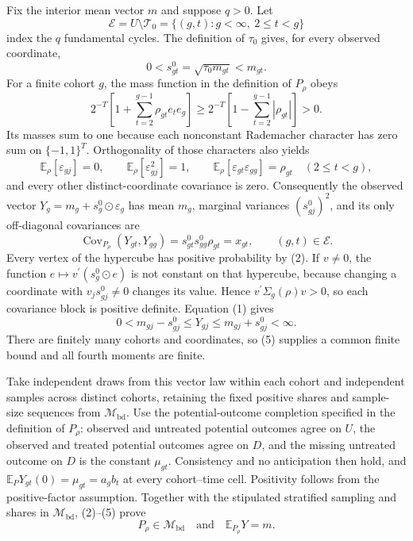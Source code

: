 Fix the interior mean vector \(m\) and suppose \(q>0\).  Let
\[
\mathcal E=U\setminus\mathcal T_0
=\{(g,t):g<\infty,\ 2\le t<g\}
\]
index the \(q\) fundamental cycles.  The definition of \(\tau_0\) gives, for every observed coordinate,
\[
0<s^0_{gt}=\sqrt{\tau_0m_{gt}}<m_{gt}.                 \tag{1}
\]
For a finite cohort \(g\), the mass function in the definition of \(P_\rho\) obeys
\[
2^{-T}\left[1+\sum_{t=2}^{g-1}\rho_{gt}e_te_g\right]
\ge
2^{-T}\left[1-\sum_{t=2}^{g-1}|\rho_{gt}|\right]>0.   \tag{2}
\]
Its masses sum to one because each nonconstant Rademacher character has zero sum on \(\{-1,1\}^T\).  Orthogonality of those characters also yields
\[
\mathbb E_\rho[\varepsilon_{gj}]=0,
\qquad
\mathbb E_\rho[\varepsilon_{gj}^2]=1,
\qquad
\mathbb E_\rho[\varepsilon_{gt}\varepsilon_{gg}]=\rho_{gt}
\quad(2\le t<g),                                      \tag{3}
\]
and every other distinct-coordinate covariance is zero.  Consequently the observed vector
\(Y_g=m_g+s_g^0\odot\varepsilon_g\) has mean \(m_g\), marginal variances \((s^0_{gj})^2\), and its only off-diagonal covariances are
\[
\operatorname{Cov}_{P_\rho}(Y_{gt},Y_{gg})
=s^0_{gt}s^0_{gg}\rho_{gt}=x_{gt},
\qquad (g,t)\in\mathcal E.                             \tag{4}
\]
Every vertex of the hypercube has positive probability by (2).  If \(v\ne0\), the function \(e\mapsto v^{\prime}(s_g^0\odot e)\) is not constant on that hypercube, because changing a coordinate with \(v_js^0_{gj}\ne0\) changes its value.  Hence
\(v^{\prime}\Sigma_g(\rho)v>0\), so each covariance block is positive definite.  Equation (1) gives
\[
0<m_{gj}-s^0_{gj}\le Y_{gj}\le m_{gj}+s^0_{gj}<\infty. \tag{5}
\]
There are finitely many cohorts and coordinates, so (5) supplies a common finite bound and all fourth moments are finite.

Take independent draws from this vector law within each cohort and independent samples across distinct cohorts, retaining the fixed positive shares and sample-size sequences from \(\mathcal M_{\mathrm{bd}}\).  Use the potential-outcome completion specified in the definition of \(P_\rho\): observed and untreated potential outcomes agree on \(U\), the observed and treated potential outcomes agree on \(D\), and the missing untreated outcome on \(D\) is the constant \(\mu_{gt}\).  Consistency and no anticipation then hold, and
\(\mathbb E_PY_{gt}(0)=\mu_{gt}=a_gb_t\) at every cohort--time cell.  Positivity follows from the positive-factor assumption.  Together with the stipulated stratified sampling and shares in \(\mathcal M_{\mathrm{bd}}\), (2)--(5) prove
\[
P_\rho\in\mathcal M_{\mathrm{bd}}
\quad\text{and}\quad
\mathbb E_{P_\rho}Y=m.                                \tag{6}
\]

